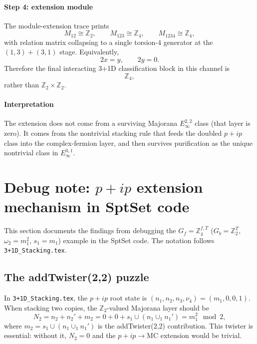 \documentclass{SciPost}
\begin{document}
\paragraph{Step 4: extension module}
The module-extension trace prints
\begin{equation}
M_{12} \cong \mathbb Z_2,\qquad
M_{123} \cong \mathbb Z_4,\qquad
M_{1234} \cong \mathbb Z_4,
\end{equation}
with relation matrix collapsing to a single torsion-$4$ generator at the $(1,3)+(3,1)$ stage.
Equivalently,
\begin{equation}
2x = y,\qquad 2y = 0.
\end{equation}
Therefore the final interacting 3+1D classification block in this channel is
\begin{equation}
\mathbb Z_4,
\end{equation}
rather than $\mathbb Z_2 \times \mathbb Z_2$.

\paragraph{Interpretation}
The extension does not come from a surviving Majorana $E_\infty^{2,2}$ class (that layer is zero).
It comes from the nontrivial stacking rule that feeds the doubled $p+ip$ class into the complex-fermion layer, and then survives purification as the unique nontrivial class in $E_\infty^{3,1}$.


\section{Debug note: $p+ip$ extension mechanism in SptSet code}
\label{sec:debug_pip_extension}

This section documents the findings from debugging the $G_f = \mathbb{Z}_4^{f,T}$ ($G_b = \mathbb{Z}_2^T$, $\omega_2 = m_1^2$, $s_1 = m_1$) example in the SptSet code.
The notation follows \texttt{3+1D\_Stacking.tex}.

\subsection{The addTwister(2,2) puzzle}

In \texttt{3+1D\_Stacking.tex}, the $p+ip$ root state is $(n_1, n_2, n_3, \nu_4) = (m_1, 0, 0, 1)$.
When stacking two copies, the $\mathbb{Z}_2$-valued Majorana layer should be
\begin{equation}
N_2 = n_2 + n_2' + m_2 = 0 + 0 + s_1 \cup (n_1 \cup_1 n_1') = m_1^2 \mod 2,
\end{equation}
where $m_2 = s_1 \cup (n_1 \cup_1 n_1')$ is the addTwister(2,2) contribution.
This twister is essential: without it, $N_2 = 0$ and the $p+ip \to \mathrm{MC}$ extension would be trivial.
\end{document}
